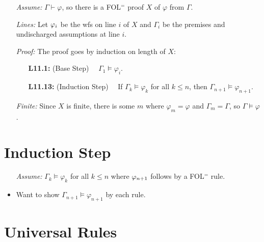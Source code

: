 \documentclass[a4paper, 11pt]{article} %
\begin{document}
\begin{enumerate}
  \item[\it Assume:] $\Gamma \vdash \varphi$, so there is a FOL$^=$ proof $X$ of $\varphi$ from $\Gamma$. 
  \item[\it Lines:] Let $\varphi_i$ be the wfs on line $i$ of $X$ and $\Gamma_i$ be the premises and undischarged assumptions at line $i$. 
  \item[\it Proof:] The proof goes by induction on length of $X$:
    \begin{itemize}
      \item[\bf L11.1:] (Base Step)~~ $\Gamma_1 \vDash \varphi_i$. 
      \item[\bf L11.13:] (Induction Step)~~ If $\Gamma_k \vDash \varphi_k$ for all $k\leq n$, then $\Gamma_{n+1} \vDash \varphi_{n+1}$. 
    \end{itemize}
  \item[\it Finite:] Since $X$ is finite, there is some $m$ where $\varphi_m=\varphi$ and $\Gamma_m=\Gamma$, so $\Gamma \vDash \varphi$.
\end{enumerate}




\section*{Induction Step}

\begin{itemize}
  \item[\it Assume:] $\Gamma_k \vDash \varphi_k$ for all $k\leq n$ where $\varphi_{n+1}$ follows by a FOL$^=$ rule. 
  \item Want to show $\Gamma_{n+1}\vDash\varphi_{n+1}$ by each rule.
\end{itemize}





\section*{Universal Rules}
\end{document}
